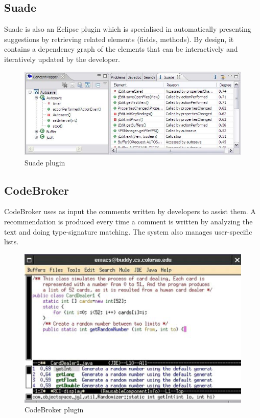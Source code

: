 \documentclass{l4proj}
\begin{document}
\newpage
\subsection{Suade}
Suade \cite{suade} is also an Eclipse plugin which is specialised in automatically presenting suggestions by retrieving related elements (fields, methods). By design, it contains a dependency graph of the elements that can be interactively and iteratively updated by the developer.

\begin{figure}[H]
\includegraphics[scale=0.9]{suade}
\centering
\caption{Suade plugin}\label{suade}
\label{fig:suade}
\end{figure}

\subsection{CodeBroker}
CodeBroker \cite{codebroker} uses as input the comments written by developers to assist them. A recommendation is produced every time a comment is written by analyzing the text and doing type-signature matching. The system also manages user-specific lists.

\begin{figure}[H]
\includegraphics[scale=0.4]{code-broker}
\centering
\caption{CodeBroker plugin}\label{code-broker}
\label{fig:code-broker}
\end{figure}
\end{document}
